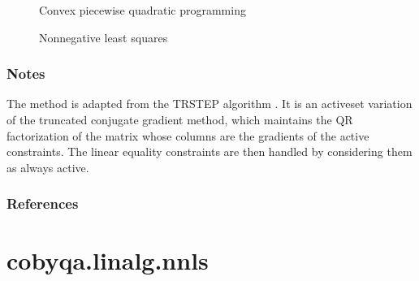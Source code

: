 \documentclass[letterpaper,10pt,english]{sphinxmanual}
\begin{document}
\begin{fulllineitems}
\begin{description}
\item[{{\hyperref[\detokenize{refs/generated/cobyqa.linalg.cpqp:cobyqa.linalg.cpqp}]{}}}] \leavevmode
\sphinxAtStartPar
Convex piecewise quadratic programming

\item[{{\hyperref[\detokenize{refs/generated/cobyqa.linalg.nnls:cobyqa.linalg.nnls}]{}}}] \leavevmode
\sphinxAtStartPar
Nonnegative least squares

\end{description}


\subsubsection*{Notes}

\sphinxAtStartPar
The method is adapted from the TRSTEP algorithm . It is an
active\sphinxhyphen{}set variation of the truncated conjugate gradient method, which
maintains the QR factorization of the matrix whose columns are the gradients
of the active constraints. The linear equality constraints are then handled
by considering them as always active.
\subsubsection*{References}

\sphinxAtStartPar
{}

\end{fulllineitems}



\section{cobyqa.linalg.nnls}
\label{\detokenize{refs/generated/cobyqa.linalg.nnls:cobyqa-linalg-nnls}}\label{\detokenize{refs/generated/cobyqa.linalg.nnls::doc}}
\end{document}
